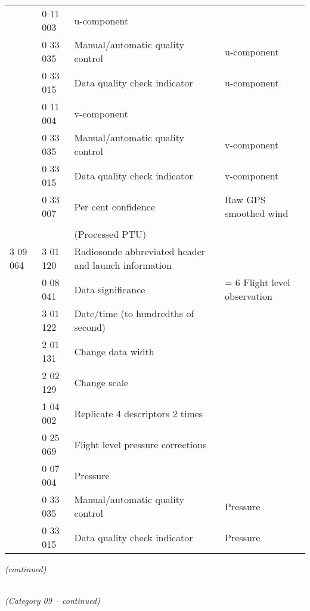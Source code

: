\begin{longtable}[]{@{}llll@{}}
& 0 11 003 & u-component &\tabularnewline
& 0 33 035 & Manual/automatic quality control & u-component\tabularnewline
& 0 33 015 & Data quality check indicator & u-component\tabularnewline
& 0 11 004 & v-component &\tabularnewline
& 0 33 035 & Manual/automatic quality control & v-component\tabularnewline
& 0 33 015 & Data quality check indicator & v-component\tabularnewline
& 0 33 007 & Per cent confidence & Raw GPS smoothed wind\tabularnewline
& & &\tabularnewline
& & (Processed PTU) &\tabularnewline
3 09 064 & 3 01 120 & Radiosonde abbreviated header and launch information &\tabularnewline
& 0 08 041 & Data significance & = 6 Flight level observation\tabularnewline
& 3 01 122 & Date/time (to hundredths of second) &\tabularnewline
& 2 01 131 & Change data width &\tabularnewline
& 2 02 129 & Change scale &\tabularnewline
& 1 04 002 & Replicate 4 descriptors 2 times &\tabularnewline
& 0 25 069 & Flight level pressure corrections &\tabularnewline
& 0 07 004 & Pressure &\tabularnewline
& 0 33 035 & Manual/automatic quality control & Pressure\tabularnewline
& 0 33 015 & Data quality check indicator & Pressure\tabularnewline
\bottomrule
\end{longtable}

\emph{(continued)}

\emph{\\
(Category 09 -- continued)}

